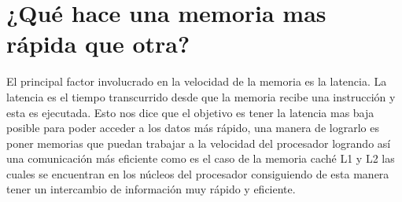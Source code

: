 \documentclass{article}
\begin{document}
\section{¿Qué hace una memoria mas rápida que otra?}

El principal factor involucrado en la velocidad de la memoria es la latencia. La latencia es el tiempo transcurrido desde que la memoria recibe una instrucción y esta es ejecutada. Esto nos dice que el objetivo es tener la latencia mas baja posible para poder acceder a los datos más rápido, una manera de lograrlo es poner memorias que puedan trabajar a la velocidad del procesador logrando así una comunicación más eficiente como es el caso de la memoria caché L1 y L2 las cuales se encuentran en los núcleos del procesador consiguiendo de esta manera tener un intercambio de información muy rápido y eficiente.  
\end{document}
